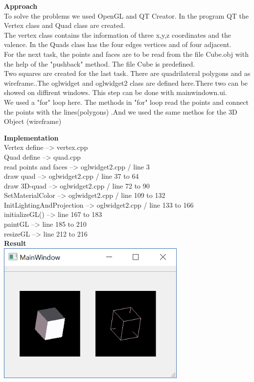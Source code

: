 \documentclass[12pt,a4paper]{scrartcl}
\begin{document}
\textbf{Approach}\\
To solve the problems we used OpenGL and QT Creator. In the program QT the Vertex class and Quad class are created.\\
The vertex class contains the information of three x,y,z coordinates and the valence. In the Quads class has the four edges vertices and of four adjacent.\\
For the next task, the points and faces are to be read from the file Cube.obj with the help of the "pushback" method. The file Cube is predefined. \\
Two squares are created for the last task. There are quadrilateral polygons and as wireframe..The oglwidget and oglwidget2 class are defined here.There two can be showed on diffirent windows. This step can be done with mainwindown.ui.\\
We used a "for" loop here. The methods in "for" loop read the points and connect the points with the lines(polygons) .And we used the same methos for the 3D Object (wireframe)\\[0,5cm]

\newpage

\textbf{Implementation}\\


Vertex define --> vertex.cpp\\
Quad define --> quad.cpp\\
read points and faces --> oglwidget2.cpp / line 3\\
draw quad --> oglwidget2.cpp / line 37 to 64\\
draw 3D-quad --> oglwidget2.cpp / line 72 to 90\\
SetMaterialColor --> oglwidget2.cpp / line 109 to 132\\
InitLightingAndProjection --> oglwidget2.cpp / line 133 to 166\\
initializeGL() --> line 167 to 183\\
paintGL --> line 185 to 210\\
resizeGL --> line 212 to 216 \\[0,5cm]



\textbf{Result}\\

\includegraphics[width=0.7\textwidth]{Problem 1.png}\\
\end{document}
